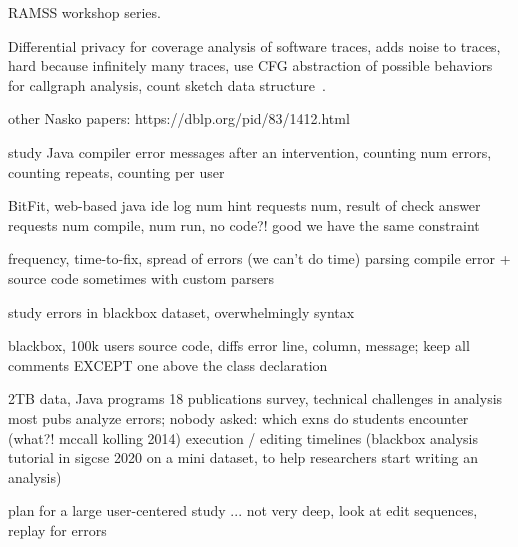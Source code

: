 \documentclass[english,submission,cleveref]{programming}
\begin{document}
RAMSS workshop series.

Differential privacy for coverage analysis of software traces,
adds noise to traces,
hard because infinitely many traces,
use CFG abstraction of possible behaviors for callgraph analysis,
count sketch data structure~\cite{hlzbr-ecoop-2021}.

other Nasko papers:
https://dblp.org/pid/83/1412.html


\cite{bgimgm-cse-2016}
study Java compiler error messages after an intervention, counting num errors,
counting repeats, counting per user

\cite{anna-russo-kennedy-ms-2006}
BitFit, web-based java ide log num hint requests num, result of check answer
requests num compile, num run, no code?! good we have the same constraint

\cite{ab-sigcse-2015}
frequency, time-to-fix, spread of errors
 (we can't do time)
parsing compile error + source code
 sometimes with custom parsers

\cite{m-masters-2016}
study errors in blackbox dataset,
 overwhelmingly syntax

\cite{bkmu-sigcse-2014}
blackbox, 100k users
source code, diffs
error line, column, message;
keep all comments EXCEPT one above the class declaration


\cite{bask-icer-2018}
2TB data, Java programs
18 publications survey, technical challenges in analysis
 most pubs analyze errors;
nobody asked:
 which exns do students encounter (what?! mccall kolling 2014)
 execution / editing timelines
(blackbox analysis tutorial in sigcse 2020 on a mini dataset, to help researchers start writing an analysis)


\cite{t-hatra-2021}
plan for a large user-centered study 
... not very deep, look at edit sequences, replay for errors
\end{document}
